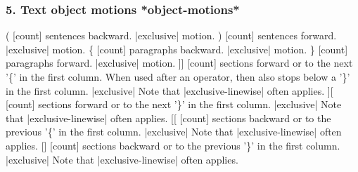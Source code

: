 \documentclass{beamer}
\begin{document}
\begin{frame}
  \frametitle{5. Text object motions					*object-motions*}
  (			[count] sentences backward.  |exclusive| motion.
  )			[count] sentences forward.  |exclusive| motion.
  \{			[count] paragraphs backward.  |exclusive| motion.
  \}			[count] paragraphs forward.  |exclusive| motion.
]]			[count] sections forward or to the next '\{' in the
  first column.  When used after an operator, then also
stops below a '\}' in the first column.  |exclusive|
Note that |exclusive-linewise| often applies.
][			[count] sections forward or to the next '\}' in the
first column.  |exclusive|
Note that |exclusive-linewise| often applies.
[[			[count] sections backward or to the previous '\{' in
      the first column.  |exclusive|
      Note that |exclusive-linewise| often applies.
    []			[count] sections backward or to the previous '\}' in
    the first column.  |exclusive|
    Note that |exclusive-linewise| often applies.
\end{frame}
\end{document}
